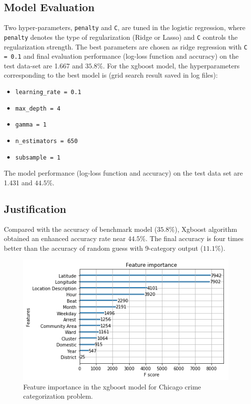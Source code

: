 \documentclass[12pt]{article}
\begin{document}
\subsection{Model Evaluation}
Two hyper-parameters, \verb|penalty| and \verb|C|, are tuned in the logistic regression, where \verb|penalty| denotes the type of regularization (Ridge or Lasso) and \verb|C| controls the regularization strength. The best parameters are chosen as ridge regression with \verb|C = 0.1| and final evaluation performance (log-loss function and accuracy) on the test data-set are 1.667 and $35.8\%$.
For the xgboost model, the hyperparameters corresponding to the best model is (grid search result saved in log files): 
\begin{itemize}
\item \verb|learning_rate = 0.1|
\item \verb|max_depth = 4|
\item \verb|gamma = 1|
\item \verb|n_estimators = 650|
\item \verb|subsample = 1|
\end{itemize}
The model performance (log-loss function and accuracy) on the test data set are 1.431 and $44.5\%$.

\subsection{Justification}
Compared with the accuracy of benchmark model ($35.8\%$), Xgboost algorithm obtained an enhanced accuracy rate near $44.5\%$. The final accuracy is four times better than the accuracy of random guess with 9-category output ($11.1\%$). 

\begin{figure}[ht]
\includegraphics[scale=0.8]{figure/feature_importance.png}
\centering
\caption{Feature importance in the xgboost model for Chicago crime categorization problem.}
\label{fig:xgboost}
\end{figure}
\end{document}
